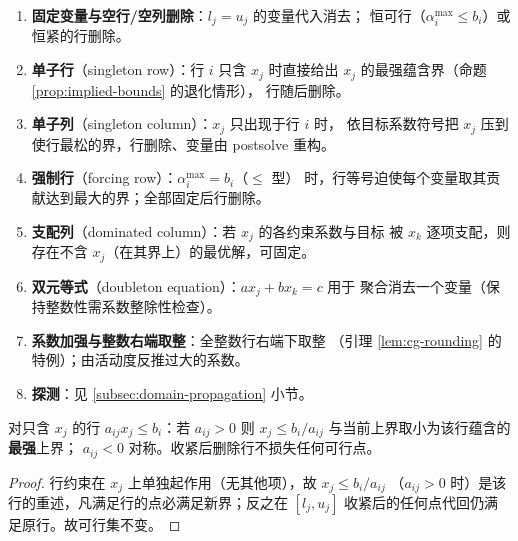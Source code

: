 \begin{enumerate}
  \item \textbf{固定变量与空行/空列删除}：$l_j = u_j$ 的变量代入消去；
        恒可行（$\alpha_i^{\max} \le b_i$）或恒紧的行删除。
  \item \textbf{单子行}（singleton row）：行 $i$ 只含 $x_j$ 时直接给出
        $x_j$ 的最强蕴含界（命题 \ref{prop:implied-bounds} 的退化情形），
        行随后删除。
  \item \textbf{单子列}（singleton column）：$x_j$ 只出现于行 $i$ 时，
        依目标系数符号把 $x_j$ 压到使行最松的界，行删除、变量由
        postsolve 重构。
  \item \textbf{强制行}（forcing row）：$\alpha_i^{\max} = b_i$（$\le$ 型）
        时，行等号迫使每个变量取其贡献达到最大的界；全部固定后行删除。
  \item \textbf{支配列}（dominated column）：若 $x_j$ 的各约束系数与目标
        被 $x_k$ 逐项支配，则存在不含 $x_j$（在其界上）的最优解，可固定。
  \item \textbf{双元等式}（doubleton equation）：$a x_j + b x_k = c$ 用于
        聚合消去一个变量（保持整数性需系数整除性检查）。
  \item \textbf{系数加强与整数右端取整}：全整数行右端下取整
        （引理 \ref{lem:cg-rounding} 的特例）；由活动度反推过大的系数。
  \item \textbf{探测}：见 \ref{subsec:domain-propagation} 小节。
\end{enumerate}

\begin{proposition}[单子行收紧的完备性]
对只含 $x_j$ 的行 $a_{ij} x_j \le b_i$：若 $a_{ij} > 0$ 则
$x_j \le b_i / a_{ij}$ 与当前上界取小为该行蕴含的\textbf{最强}上界；
$a_{ij} < 0$ 对称。收紧后删除行不损失任何可行点。
\end{proposition}
\begin{proof}
行约束在 $x_j$ 上单独起作用（无其他项），故 $x_j \le b_i/a_{ij}$
（$a_{ij} > 0$ 时）是该行的重述，凡满足行的点必满足新界；反之在
$[l_j, u_j]$ 收紧后的任何点代回仍满足原行。故可行集不变。
\end{proof}

